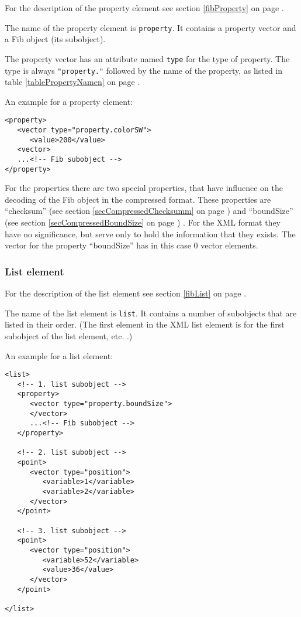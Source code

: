 For the description of the property element see section \ref{fibProperty} on page \pageref{fibProperty} .

The name of the property element is \verb|property|. It contains a property vector and a Fib object (its subobject).

The property vector has an attribute named \verb|type| for the type of property. The type is always \verb|"property."| followed by the name of the property, as listed in table \ref{tablePropertyNamen} on page \pageref{tablePropertyNamen} .

\bigskip\noindent
An example for a property element:
\begin{verbatim}
<property>
   <vector type="property.colorSW">
      <value>200</value>
   <vector>
   ...<!-- Fib subobject -->
</property>
\end{verbatim}

\bigskip\noindent
For the properties there are two special properties, that have influence on the decoding of the Fib object in the compressed format. These properties are ``checksum'' (see section \ref{secCompressedChecksumm} on page \pageref{secCompressedChecksumm}) and ``boundSize'' (see section \ref{secCompressedBoundSize} on page \pageref{secCompressedBoundSize}) .
For the XML format they have no significance, but serve only to hold the information that they exists. The vector for the property ``boundSize'' has in this case $0$ vector elements.




\subsubsection{List element}

For the description of the list element see section \ref{fibList} on page \pageref{fibList} .

The name of the list element is \verb|list|. It contains a number of subobjects that are listed in their order. (The first element in the XML list element is for the first subobject of the list element, etc. .)

\bigskip\noindent
An example for a list element:
\begin{verbatim}
<list>
   <!-- 1. list subobject -->
   <property>
      <vector type="property.boundSize">
      </vector>
      ...<!-- Fib subobject -->
   </property>

   <!-- 2. list subobject -->
   <point>
      <vector type="position">
         <variable>1</variable>
         <variable>2</variable>
      </vector>
   </point>

   <!-- 3. list subobject -->
   <point>
      <vector type="position">
         <variable>52</variable>
         <value>36</value>
      </vector>
   </point>

</list>
\end{verbatim}

